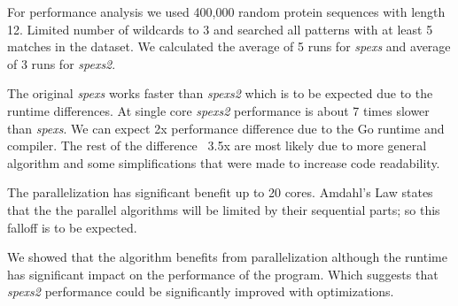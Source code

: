For performance analysis we used 400,000 random protein sequences with length 12. Limited number of wildcards to 3 and searched all patterns with at least 5 matches in the dataset. We calculated the average of 5 runs for \emph{spexs} and average of 3 runs for \emph{spexs2}.

\begin{figure}[H]
\end{figure}

The original \emph{spexs} works faster than \emph{spexs2} which is to be expected due to the runtime differences. At single core \emph{spexs2} performance is about 7 times slower than \emph{spexs}. We can expect 2x performance difference due to the Go runtime and compiler. The rest of the difference ~3.5x are most likely due to more general algorithm and some simplifications that were made to increase code readability.

The parallelization has significant benefit up to 20 cores. Amdahl's Law \cite{AmdahlsReval} states that the the parallel algorithms will be limited by their sequential parts; so this falloff is to be expected.

We showed that the algorithm benefits from parallelization although the runtime has significant impact on the performance of the program. Which suggests that \emph{spexs2} performance could be significantly improved with optimizations.